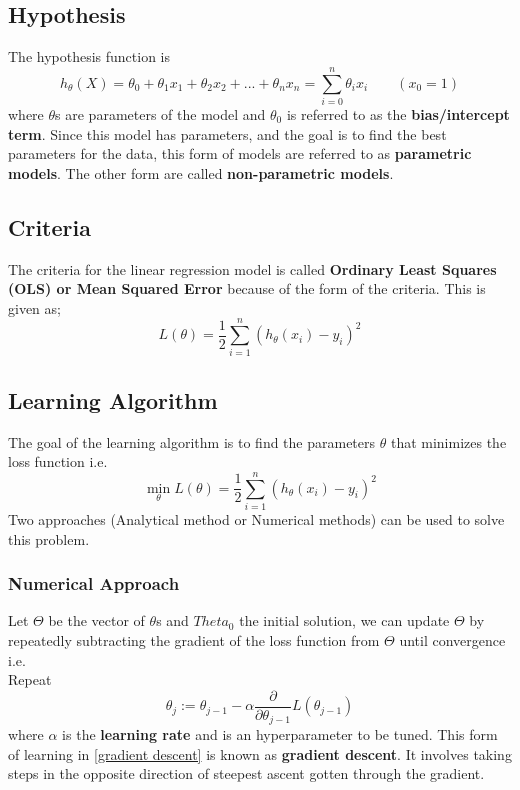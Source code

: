 \documentclass[12pt,a4paper,titlepage,portrait,openany]{book}
\begin{document}
	\subsection{Hypothesis}
	The hypothesis function is \\
	\begin{equation}
		h_{\theta}(X) = \theta_0 + \theta_1x_1 + \theta_2x_2 + ... + \theta_nx_n
		= \sum_{i=0}^{n}\theta_ix_i \qquad (x_0=1)
	\end{equation}
	where $\theta$s are parameters of the model and $\theta_0$ is referred to as the \textbf{bias/intercept term}. Since this model has parameters, and the goal is to find the best parameters for the data, this form of models are referred to as \textbf{parametric models}. The other form are called \textbf{non-parametric models}.
	
	\subsection{Criteria}
	The criteria for the linear regression model is called \textbf{Ordinary Least Squares (OLS) or Mean Squared Error} because of the form of the criteria.  This is given as;
	\begin{equation}\label{loss_function}
	L(\theta) = \dfrac{1}{2}\sum_{i=1}^{n}\left(h_\theta(x_i) - y_i\right)^2
	\end{equation}
	
	\subsection{Learning Algorithm}
	The goal of the learning algorithm is to find the parameters $\theta$ that minimizes the loss function i.e. \\ $$ \min\limits_{\theta}L(\theta) = \dfrac{1}{2}\sum_{i=1}^{n}\left(h_\theta(x_i) - y_i\right)^2 $$
	Two approaches (Analytical method or Numerical methods) can be used to solve this problem.
	
	\subsubsection{Numerical Approach}
	Let $\Theta$ be the vector of $\theta$s and $Theta_0$ the initial solution, we can update $\Theta$ by repeatedly subtracting the gradient of the loss function from $\Theta$ until convergence i.e. \\
	Repeat 
	\begin{equation}\label{gradient descent}
	\theta_j := \theta_{j-1} - \alpha\dfrac{\partial}{\partial\theta_{j-1}}L(\theta_{j-1})
	\end{equation} where $\alpha$ is the \textbf{learning rate} and is an hyperparameter to be tuned.
	This form of learning in \eqref{gradient descent} is known as \textbf{gradient descent}. It involves taking steps in the opposite direction of steepest ascent gotten through the gradient.
	
\end{document}
